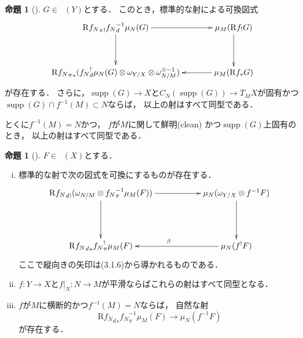 \documentclass[leqno, 10pt, a4paper, dvipdfmx]{jsarticle}
\theoremstyle{definition}
\numberwithin{equation}{section}
\newcommand{\supp}{\mathop{\mathrm{supp}}\nolimits}
\newcommand{\Dompb}{\mathop{\mathsf{D}^\mathrm{b}}\nolimits}
\newcommand{\Rder}{\mathrm{R}}
\newcommand{\tens}[1][]{\mathbin{\otimes_{\raise1.5ex\hbox to-.1em{}{#1}}}}
\newcommand{\mres}[2][]{{\left.{#1}\right\rvert}_{#2}}
\theoremstyle{mystyle}
\newtheorem{PRP}[AXM]{命題}
\renewenvironment{leftbar}{%
  \def\FrameCommand{\textcolor{lightgray}{\vrule width 4pt} \hspace{10pt}}%
  \MakeFramed {\advance\hsize-\width \FrameRestore}}%
{\endMakeFramed}
\newcommand{\mpb}[1][]{{#1}_{\pi}} %
\newcommand{\mdiff}[1][]{{#1}_{d}} %
\begin{document}
\begin{leftbar}
\begin{PRP}[{\cite[Prop.4.3.4]{KS90}}]\label{prp4.3.4}
  \(G\in\Dompb(Y)\)とする．
  このとき，標準的な射による可換図式    
  \[    
      \vcenter{\xymatrix@C=36pt@R=36pt{
      \Rder{{\mpb[f_{N}]}_{!}}{\mdiff[f_{N}]^{-1}}\mu_{N}(G)
      \ar[d]
      \ar[r]
      &
      \mu_{M}(\Rder{f_{!}}G)
      \ar[d]
      \\
      \Rder{{\mpb[f_{N}]}_{\ast}}({\mdiff[f_{N}]^{!}}\mu_{N}(G)\tens[]\omega_{Y/X}\tens[]\omega_{N/M}^{\otimes{-1}})
      &
      \mu_{M}(\Rder{f_{\ast}}G)
      \ar[l]
      }}
  \]が存在する．
  さらに，\(\supp(G)\to X\)と\(
      C_N(\supp(G))\to T_{M}X
  \)が固有かつ\(\supp(G)\cap f^{-1}(M)\subset N\)ならば，
  以上の射はすべて同型である．
  
  とくに\(f^{-1}(M)=N\)かつ，
  \(f\)が\(M\)に関して鮮明\footnotemark[2] (clean) かつ\(\supp(G)\)上固有のとき，
  以上の射はすべて同型である．
\end{PRP}
\end{leftbar}


\begin{leftbar}
\begin{PRP}[{\cite[Prop.4.3.5]{KS90}}]\label{prp4.3.5}
  \(F\in\Dompb(X)\)とする．
  \begin{enumerate}[(i)]
      \item 標準的な射で次の図式を可換にするものが存在する．
      \[\vcenter{\xymatrix@C=56pt@R=46pt{
          \Rder{{\mdiff[f_N]}_{!}}(\omega_{N/M}\tens[]{\mpb[f_N]^{-1}}\mu_{M}(F))
          \ar[d]^{}
          \ar[r]_{}
          &
          \mu_{N}(\omega_{Y/X}\tens[]{f^{-1}}F)
          \ar[d]
          \\
          \Rder{{\mdiff[f_N]}_{\ast}}{\mpb[f_N]^{!}}\mu_{M}(F)
          &
          \mu_{N}({f^{!}}F)
          \ar[l]_{\beta}
      }}\]
      ここで縦向きの矢印は(3.1.6)から導かれるものである．
      \item \(f\colon Y\to X\)と\(\mres[f]{N}\colon N\to M\)が平滑ならばこれらの射はすべて同型となる．    
      \item \(f\)が\(M\)に横断的かつ\(f^{-1}(M)=N\)ならば，
      自然な射\[
          \Rder{{\mdiff[f_N]}_{\ast}}\mpb[f_N]^{-1}\mu_{M}(F)
          \to \mu_{N}(f^{-1}F)
      \]が存在する．
  \end{enumerate}
\end{PRP}
\end{leftbar}
\end{document}
